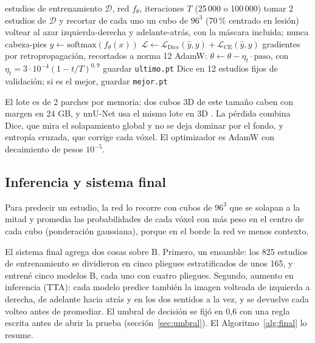 \begin{algorithm}[h]
\caption{Una corrida de entrenamiento (igual para todos los brazos).}
\label{alg:entrenar}
\small
\begin{algorithmic}[1]
\Require estudios de entrenamiento $\mathcal{D}$, red $f_\theta$, iteraciones $T$ (25\,000 o 100\,000)
  \State tomar 2 estudios de $\mathcal{D}$ y recortar de cada uno un cubo de $96^3$ (70\,\% centrado en lesión)
  \State voltear al azar izquierda-derecha y adelante-atrás, con la máscara incluida; nunca cabeza-pies
  \State $\hat y \gets \mathrm{softmax}(f_\theta(x))$ 
  \State $\mathcal{L} \gets \mathcal{L}_{\mathrm{Dice}}(\hat y, y) + \mathcal{L}_{\mathrm{CE}}(\hat y, y)$
  \State gradientes por retropropagación, recortados a norma 12
  \State AdamW: $\theta \gets \theta - \eta_t \cdot \mathrm{paso}$, con $\eta_t = 3\cdot10^{-4}(1-t/T)^{0{,}9}$
   guardar \texttt{ultimo.pt} \EndIf
   Dice en 12 estudios fijos de validación; si es el mejor, guardar \texttt{mejor.pt} \EndIf
\EndFor
\end{algorithmic}
\end{algorithm}

El lote es de 2 parches por memoria: dos cubos 3D de este tamaño caben con margen en 24 GB, y nnU-Net usa el mismo lote en 3D \citep{isensee2021nnunet}. La pérdida combina Dice, que mira el solapamiento global y no se deja dominar por el fondo, y entropía cruzada, que corrige cada vóxel. El optimizador es AdamW \citep{loshchilov2019} con decaimiento de pesos $10^{-5}$.

\subsection{Inferencia y sistema final}

Para predecir un estudio, la red lo recorre con cubos de $96^3$ que se solapan a la mitad y promedia las probabilidades de cada vóxel con más peso en el centro de cada cubo (ponderación gaussiana), porque en el borde la red ve menos contexto.

El sistema final agrega dos cosas sobre B. Primero, un ensamble: los 825 estudios de entrenamiento se dividieron en cinco pliegues estratificados de unos 165, y entrené cinco modelos B, cada uno con cuatro pliegues. Segundo, aumento en inferencia (TTA): cada modelo predice también la imagen volteada de izquierda a derecha, de adelante hacia atrás y en los dos sentidos a la vez, y se devuelve cada volteo antes de promediar. El umbral de decisión se fijó en 0,6 con una regla escrita antes de abrir la prueba (sección~\ref{sec:umbral}). El Algoritmo~\ref{alg:final} lo resume.

